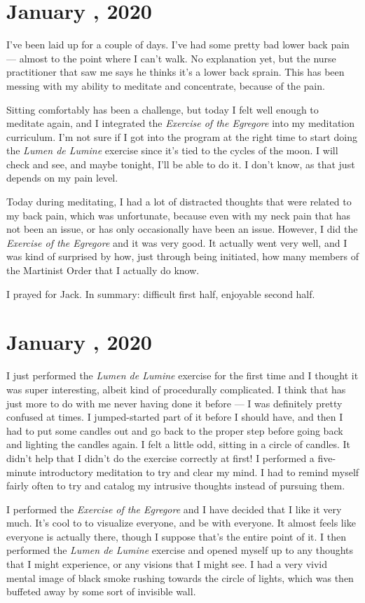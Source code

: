 \documentclass[b6paper]{article}
\newcommand*{\newentry}[3]{\pagebreak{}\section*{#1 \nth{#2}, #3}}
\newcommand{\ldl}{\emph{Lumen de Lumine} exercise}
\newcommand{ \eoe}{\textit{Exercise of the Egregore}}
\begin{document}
\newentry{January}{9}{2020}

I've been laid up for a couple of days. I've had some pretty bad lower back pain --- almost to the point where I can't walk. No explanation yet, but the nurse practitioner that saw me says he thinks it's a lower back sprain. This has been messing with my ability to meditate and concentrate, because of the pain.

Sitting comfortably has been a challenge, but today I felt well enough to meditate again, and I integrated the \textit{Exercise of the Egregore} into my meditation curriculum. I'm not sure if I got into the program at the right time to start doing the \textit{Lumen de Lumine} exercise since it's tied to the cycles of the moon. I will check and see, and maybe tonight, I'll be able to do it. I don't know, as that just depends on my pain level.

Today during meditating, I had a lot of distracted thoughts that were related to my back pain, which was unfortunate, because even with my neck pain that has not been an issue, or has only occasionally have been an issue. However, I did the \textit{Exercise of the Egregore} and it was very good. It actually went very well, and I was kind of surprised by how, just through being initiated, how many members of the Martinist Order that I actually do know.

I prayed for Jack. In summary: difficult first half, enjoyable second half.

\newentry{January}{10}{2020}

I just performed the \ldl{} for the first time and I thought it was super interesting, albeit kind of procedurally complicated. I think that has just more to do with me never having done it before --- I was definitely pretty confused at times. I jumped-started part of it before I should have, and then I had to put some candles out and go back to the proper step before going back and lighting the candles again. I felt a little odd, sitting in a circle of candles. It didn't help that I didn't do the exercise correctly at first! I performed a five-minute introductory meditation to try and clear my mind. I had to remind myself fairly often to try and catalog my intrusive thoughts instead of pursuing them.

I performed the \eoe{} and I have decided that I like it very much. It's cool to to visualize everyone, and be with everyone. It almost feels like everyone is actually there, though I suppose that's the entire point of it. I then performed the \ldl{} and opened myself up to any thoughts that I might experience, or any visions that I might see. I had a very vivid mental image of black smoke rushing towards the circle of lights, which was then buffeted away by some sort of invisible wall.
\end{document}
